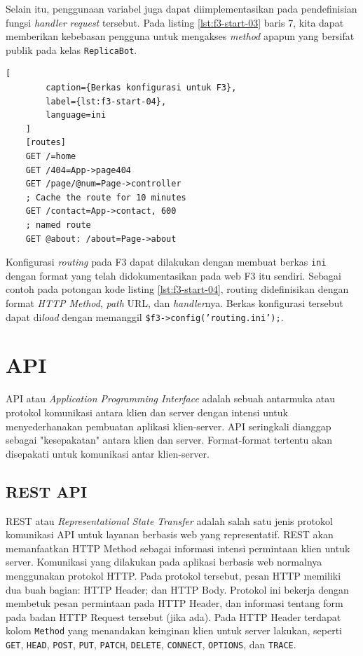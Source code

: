     Selain itu, penggunaan variabel juga dapat diimplementasikan pada pendefinisian fungsi \textit{handler} \textit{request} tersebut. Pada listing \ref{lst:f3-start-03} baris 7, kita dapat memberikan kebebasan pengguna untuk mengakses \textit{method} apapun yang bersifat publik pada kelas \texttt{ReplicaBot}.
    \begin{lstlisting}[
        caption={Berkas konfigurasi untuk F3},
        label={lst:f3-start-04},
        language=ini
    ]
    [routes]
    GET /=home
    GET /404=App->page404
    GET /page/@num=Page->controller
    ; Cache the route for 10 minutes
    GET /contact=App->contact, 600
    ; named route
    GET @about: /about=Page->about
     \end{lstlisting}
     Konfigurasi \textit{routing} pada F3 dapat dilakukan dengan membuat berkas \texttt{ini} dengan format yang telah didokumentasikan pada web F3 itu sendiri. Sebagai contoh pada potongan kode listing \ref{lst:f3-start-04}, routing didefinisikan dengan format \textit{HTTP Method}, \textit{path} URL, dan \textit{handler}nya.
     Berkas konfigurasi tersebut dapat di\textit{load} dengan memanggil \texttt{\$f3->config('routing.ini');}.
     
\section{API}
    API atau \textit{Application Programming Interface} adalah sebuah antarmuka atau protokol komunikasi antara klien dan server dengan intensi untuk menyederhanakan pembuatan aplikasi klien-server. 
    API seringkali dianggap sebagai "kesepakatan" antara klien dan server. Format-format tertentu akan disepakati untuk komunikasi antar klien-server\cite{health-informatics}.
    
    \subsection{REST API}
    REST atau \textit{Representational State Transfer} adalah salah satu jenis protokol komunikasi API untuk layanan berbasis web yang representatif\cite{rest:roy-fielding}. REST akan memanfaatkan HTTP Method sebagai informasi intensi permintaan klien untuk server. Komunikasi yang dilakukan pada aplikasi berbasis web normalnya menggunakan protokol HTTP. Pada protokol tersebut, pesan HTTP memiliki dua buah bagian: HTTP Header; dan HTTP Body\cite{RFC7231}. Protokol ini bekerja dengan membetuk pesan permintaan pada HTTP Header, dan informasi tentang form pada badan HTTP Request tersebut (jika ada). Pada HTTP Header terdapat kolom \texttt{Method} yang menandakan keinginan klien untuk server lakukan, seperti \texttt{GET}, \texttt{HEAD}, \texttt{POST}, \texttt{PUT}, \texttt{PATCH}, \texttt{DELETE}, \texttt{CONNECT}, \texttt{OPTIONS}, dan \texttt{TRACE}\cite[P.~21]{RFC7231}. 

